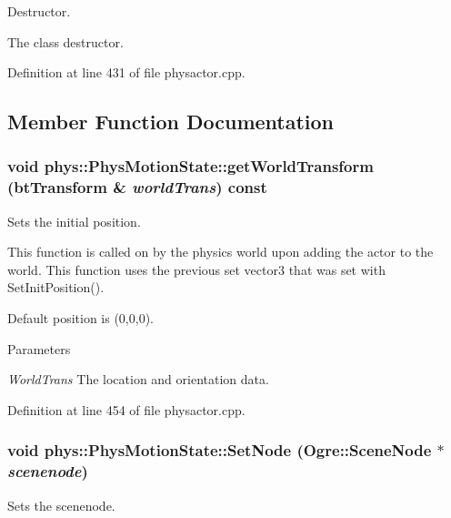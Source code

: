 Destructor. 

The class destructor. 

Definition at line 431 of file physactor.cpp.



\subsection{Member Function Documentation}
\hypertarget{classphys_1_1PhysMotionState_a80e8549fbab99150ba8f34aa3bf087d8}{
\subsubsection[{getWorldTransform}]{\setlength{\rightskip}{0pt plus 5cm}void phys::PhysMotionState::getWorldTransform (btTransform \& {\em worldTrans}) const}}
\label{dc/d0d/classphys_1_1PhysMotionState_a80e8549fbab99150ba8f34aa3bf087d8}


Sets the initial position. 

This function is called on by the physics world upon adding the actor to the world. This function uses the previous set vector3 that was set with SetInitPosition(). \par
 Default position is (0,0,0). 
\begin{DoxyParams}{Parameters}
\item[{\em WorldTrans}]The location and orientation data. \end{DoxyParams}


Definition at line 454 of file physactor.cpp.

\hypertarget{classphys_1_1PhysMotionState_a034376e768543b377430611dff323412}{
\subsubsection[{SetNode}]{\setlength{\rightskip}{0pt plus 5cm}void phys::PhysMotionState::SetNode (Ogre::SceneNode $\ast$ {\em scenenode})}}
\label{dc/d0d/classphys_1_1PhysMotionState_a034376e768543b377430611dff323412}


Sets the scenenode. 

